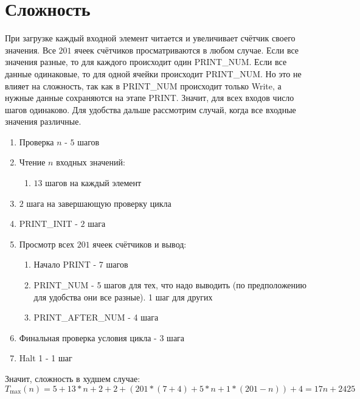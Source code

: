 \documentclass[12pt]{article}
\begin{document}
\section*{Сложность}

При загрузке каждый входной элемент читается и увеличивает счётчик своего значения. Все $201$ ячеек счётчиков просматриваются в любом случае. Если все значения разные, то для каждого происходит один PRINT\_NUM. Если все данные одинаковые, то для одной ячейки происходит PRINT\_NUM. Но это не влияет на сложность, так как в PRINT\_NUM происходит только Write, а нужные данные сохраняются на этапе PRINT. Значит, для всех входов число шагов одинаково. Для удобства дальше рассмотрим случай, когда все входные значения различные.

\begin{enumerate}
    \item Проверка $n$ - $5$ шагов
    \item Чтение $n$ входных значений:
    \begin{enumerate}
        \item $13$ шагов на каждый элемент
    \end{enumerate}
    \item $2$ шага на завершающую проверку цикла
    \item PRINT\_INIT - $2$ шага
    \item Просмотр всех $201$ ячеек счётчиков и вывод:
    \begin{enumerate}
        \item Начало PRINT - 7 шагов
        \item PRINT\_NUM - 5 шагов для тех, что надо выводить (по предположению для удобства они все разные). 1 шаг для других
        \item PRINT\_AFTER\_NUM - 4 шага
    \end{enumerate}
    \item Финальная проверка условия цикла - 3 шага
    \item Halt 1 - 1 шаг
\end{enumerate}

Значит, сложность в худшем случае:
\[
    T_{\max}(n)=5 + 13*n + 2 + 2 + (201*(7 + 4) + 5*n + 1*(201 - n)) + 4= 17n + 2425
\]
\end{document}
